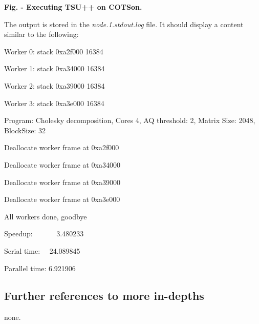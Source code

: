 \documentclass[a4paper]{article}
\newcounter{Figure}
\renewcommand\theFigure{\arabic{Figure}}
\begin{document}
{\centering{}\sffamily\bfseries
\label{bkm:Ref388170875}Fig.
\stepcounter{Figure}{\theFigure} - Executing TSU++ on COTSon.
\par}

{
The output is stored in the \textit{node.1.stdout.log }file. It should
display a content similar to the following:}



\begin{center}
\begin{minipage}{6.3465in}
{
Worker 0: stack 0xa2f000 16384}

{
Worker 1: stack 0xa34000 16384}

{
Worker 2: stack 0xa39000 16384}

{
Worker 3: stack 0xa3e000 16384}

{
Program: Cholesky decomposition, Cores 4, AQ threshold: 2, Matrix Size:
2048, BlockSize: 32}

{
Deallocate worker frame at 0xa2f000}

{
Deallocate worker frame at 0xa34000}

{
Deallocate worker frame at 0xa39000}

{
Deallocate worker frame at 0xa3e000}

{
All workers done, goodbye}

{
Speedup: \ \ \ \ \ \ 3.480233}

{
Serial time: \ \ 24.089845}

{
Parallel time: 6.921906}
\end{minipage}
\end{center}

\bigskip


\bigskip


\bigskip


\bigskip


\bigskip


\bigskip


\bigskip


\bigskip

\subsection[Further references to more in{}-depths]{Further references
to more in-depths}
{
none.}
\end{document}
